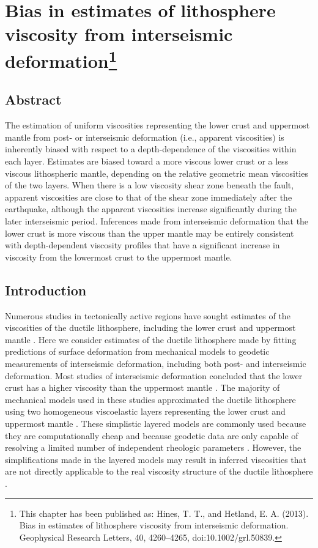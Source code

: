 \chapter
[Bias in estimates of lithosphere viscosity from interseismic deformation]
{Bias in estimates of lithosphere viscosity from interseismic deformation\footnote[1]{
This chapter has been published as: Hines, T. T., and Hetland, E. A.
(2013). Bias in estimates of lithosphere viscosity from interseismic
deformation. Geophysical Research Letters, 40, 4260--4265,
doi:10.1002/grl.50839.}}



\section{Abstract}
The estimation of uniform viscosities representing the lower crust and
uppermost mantle from post- or interseismic deformation (i.e.,
apparent viscosities) is inherently biased with respect to a
depth-dependence of the viscosities within each layer. Estimates are
biased toward a more viscous lower crust or a less viscous
lithospheric mantle, depending on the relative geometric mean
viscosities of the two layers. When there is a low viscosity shear
zone beneath the fault, apparent viscosities are close to that of the
shear zone immediately after the earthquake, although the apparent
viscosities increase significantly during the later interseismic
period.  Inferences made from interseismic deformation that the lower
crust is more viscous than the upper mantle may be entirely consistent
with depth-dependent viscosity profiles that have a significant
increase in viscosity from the lowermost crust to the uppermost
mantle.

\section{Introduction}
Numerous studies in tectonically active regions have sought estimates
of the viscosities of the ductile lithosphere, including the lower
crust and uppermost mantle \citep[e.g.,][]{Hetland2003, Pollitz2003,
Pollitz2005, Johnson2007, Hearn2009}. Here we consider estimates of
the ductile lithosphere made by fitting predictions of surface
deformation from mechanical models to geodetic measurements of
interseismic deformation, including both post- and interseismic
deformation.  Most studies of interseismic deformation concluded that
the lower crust has a higher viscosity than the uppermost mantle
\citep{Burgmann2008, Thatcher2008}. The majority of mechanical models
used in these studies approximated the ductile lithosphere using two
homogeneous viscoelastic layers representing the lower crust and
uppermost mantle \citep[e.g.,][]{Hetland2003,Pollitz2003,Hearn2009}.
These simplistic layered models are commonly used because they are
computationally cheap and because geodetic data are only capable of
resolving a limited number of independent rheologic parameters
\citep[e.g.,][]{Riva2009,Pollitz2010}.  However, the simplifications
made in the layered models may result in inferred viscosities that are
not directly applicable to the real viscosity structure of the ductile
lithosphere \citep{Riva2009}.

